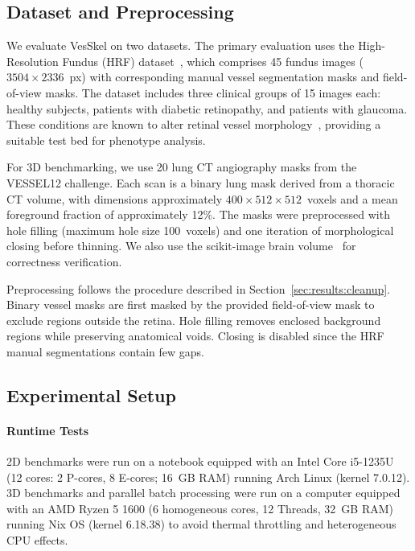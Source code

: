 \documentclass[11pt]{article}
\begin{document}
\subsection{Dataset and Preprocessing}\label{sec:methods:data}

We evaluate VesSkel on two datasets. The primary evaluation uses the
High-Resolution Fundus (HRF) dataset~\cite{HRF}, which comprises 45
fundus images ($3504 \times 2336$~px) with corresponding manual
vessel segmentation masks and field-of-view masks. The dataset
includes three clinical groups of 15 images each: healthy subjects,
patients with diabetic retinopathy, and patients with glaucoma. These
conditions are known to alter retinal vessel
morphology~\cite{popovic_regional_2019}, providing a
suitable test bed for phenotype analysis.

For 3D benchmarking, we use 20 lung CT angiography masks from the
VESSEL12 challenge. Each scan is a binary lung mask
derived from a thoracic CT volume, with dimensions approximately
$400\times512\times512$~voxels and a mean foreground fraction of
approximately 12\%. The masks were preprocessed with hole filling
(maximum hole size 100~voxels) and one iteration of morphological
closing before thinning. We also use the scikit-image brain
volume~\cite{skimage} for correctness verification.

Preprocessing follows the procedure described in
Section~\ref{sec:results:cleanup}. Binary vessel masks are first
masked by the provided field-of-view mask to exclude regions outside
the retina. Hole filling removes enclosed background regions while
preserving anatomical voids. Closing is disabled since the HRF manual
segmentations contain few gaps.

\subsection{Experimental Setup}\label{sec:methods:setup}

\paragraph{Runtime Tests}\label{sec:methods:setup:runtime}

2D benchmarks were run on a notebook equipped with an Intel Core
i5-1235U (12 cores: 2 P-cores, 8 E-cores; 16~GB RAM) running Arch
Linux (kernel 7.0.12). 3D benchmarks and parallel batch processing
were run on a computer equipped with an AMD Ryzen 5 1600 (6
homogeneous cores, 12 Threads, 32~GB RAM) running Nix OS (kernel
6.18.38) to avoid thermal throttling and
heterogeneous CPU effects.
\end{document}
